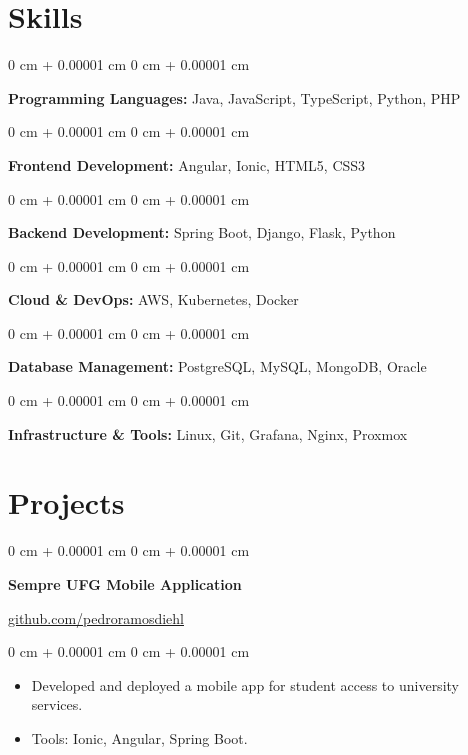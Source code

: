\documentclass[10pt, letterpaper]{article}
\newenvironment{highlights}{
    \begin{itemize}[
        topsep=0.10 cm,
        parsep=0.10 cm,
        partopsep=0pt,
        itemsep=0pt,
        leftmargin=0 cm + 10pt
    ]
}{
    \end{itemize}
} %
\newenvironment{onecolentry}{
    \begin{adjustwidth}{
        0 cm + 0.00001 cm
    }{
        0 cm + 0.00001 cm
    }
}{
    \end{adjustwidth}
} %
\newenvironment{twocolentry}[2][]{
    \onecolentry
    \def\secondColumn{#2}
    \setcolumnwidth{\fill, 4.5 cm}
    \begin{paracol}{2}
}{
    \switchcolumn \raggedleft \secondColumn
    \end{paracol}
    \endonecolentry
} %
\begin{document}
        \vspace{0.2 cm}

    \section{Skills}
        \begin{onecolentry}
            \textbf{Programming Languages:} Java, JavaScript, TypeScript, Python, PHP
        \end{onecolentry}

        \vspace{0.10 cm}
        \begin{onecolentry}
            \textbf{Frontend Development:} Angular, Ionic, HTML5, CSS3
        \end{onecolentry}

        \vspace{0.10 cm}
        \begin{onecolentry}
            \textbf{Backend Development:} Spring Boot, Django, Flask, Python
        \end{onecolentry}

        \vspace{0.10 cm}
        \begin{onecolentry}
            \textbf{Cloud & DevOps:} AWS, Kubernetes, Docker
        \end{onecolentry}

        \vspace{0.10 cm}
        \begin{onecolentry}
            \textbf{Database Management:} PostgreSQL, MySQL, MongoDB, Oracle
        \end{onecolentry}

        \vspace{0.10 cm}
        \begin{onecolentry}
            \textbf{Infrastructure & Tools:} Linux, Git, Grafana, Nginx, Proxmox
        \end{onecolentry}

    \section{Projects}

        \begin{twocolentry}{
            \href{https://github.com/pedroramosdiehl}{github.com/pedroramosdiehl}
        }
            \textbf{Sempre UFG Mobile Application}
        \end{twocolentry}
        \vspace{0.10 cm}
        \begin{onecolentry}
            \begin{highlights}
                \item Developed and deployed a mobile app for student access to university services.
                \item Tools: Ionic, Angular, Spring Boot.
            \end{highlights}
        \end{onecolentry}
\end{document}
